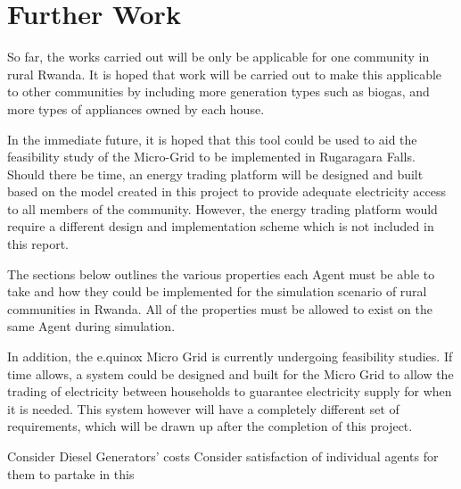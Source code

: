 \chapter{Further Work}
\label{Further Work}

So far, the works carried out will be only be applicable for one community in rural Rwanda. It is hoped that work will be carried out to make this applicable to other communities by including more generation types such as biogas, and more types of appliances owned by each house.

In the immediate future, it is hoped that this tool could be used to aid the feasibility study of the Micro-Grid to be implemented in Rugaragara Falls. Should there be time, an energy trading platform will be designed and built based on the model created in this project to provide adequate electricity access to all members of the community. However, the energy trading platform would require a different design and implementation scheme which is not included in this report.

The sections below outlines the various properties each Agent must be able to take and how they could be implemented for the simulation scenario of rural communities in Rwanda. All of the properties must be allowed to exist on the same Agent during simulation.

In addition, the e.quinox Micro Grid is currently undergoing feasibility studies. If time allows, a system could be designed and built for the Micro Grid to allow the trading of electricity between households to guarantee electricity supply for when it is needed. This system however will have a completely different set of requirements, which will be drawn up after the completion of this project.

Consider Diesel Generators' costs 
Consider satisfaction of individual agents for them to partake in this